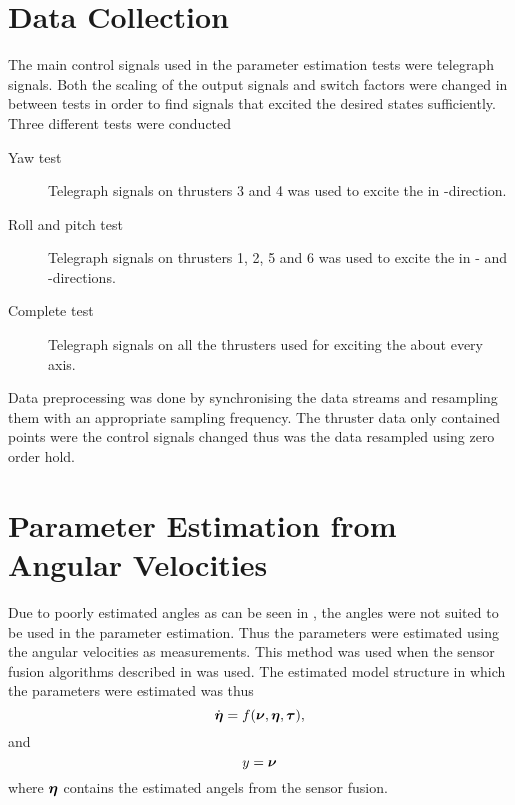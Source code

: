 \section{Data Collection} 
The main control signals used in the parameter estimation tests were telegraph signals. Both the scaling of the output signals and switch factors were changed in between tests in order to find signals that excited the desired states sufficiently.
Three different tests were conducted 
\begin{description}
\item[Yaw test] Telegraph signals on thrusters 3 and 4 was used to excite the \abbrROV in \yawAngle-direction.
\item[Roll and pitch test] Telegraph signals on thrusters 1, 2, 5 and 6 was used to excite the \abbrROV in \rollAngle- and \pitchAngle-directions.
\item[Complete test] Telegraph signals on all the thrusters used for exciting the \abbrROV about every axis.
\end{description}

Data preprocessing was done by synchronising the data streams and resampling them with an appropriate sampling frequency. The thruster data only contained points were the control signals changed thus was the data resampled using zero order hold.  

\section{Parameter Estimation from Angular Velocities} \label{sec:estimation_angular}
Due to poorly estimated angles as can be seen in , the angles were not suited to be used in the parameter estimation. Thus the parameters were estimated using the angular velocities as measurements. This method was used when the sensor fusion algorithms described in  was used. The estimated model structure in which the parameters were estimated was thus 
\begin{equation}
\dot{\boldsymbol{\eta}} = f(\boldsymbol{\nu}, \boldsymbol{\eta}, \boldsymbol{\tau}),
\end{equation}
and
\begin{equation}
y = \boldsymbol{\nu}
\end{equation}
where $\boldsymbol{\eta}$ contains the estimated angels from the sensor fusion.

